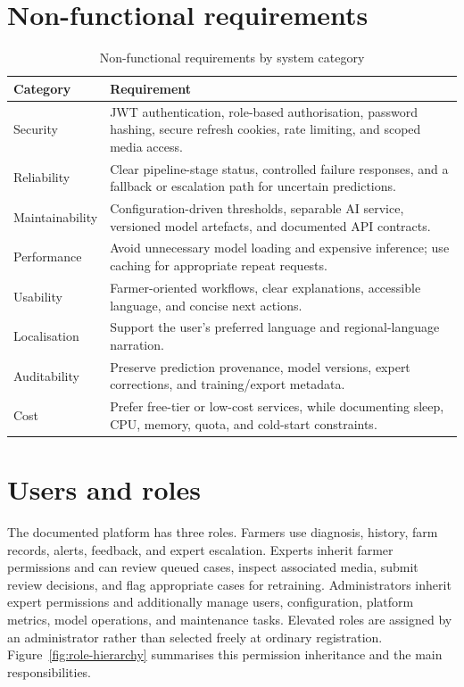 \documentclass[12pt,a4paper,oneside,openany]{report}
\begin{document}
\clearpage
\section{Non-functional requirements}
\begin{table}[H]
\centering
\small
\caption{Non-functional requirements by system category}\label{tab:non-functional-reqs}
\begin{tabular}{P{3.0cm}P{10.3cm}}
\toprule
\textbf{Category} & \textbf{Requirement}\\
\midrule
Security & JWT authentication, role-based authorisation, password hashing, secure refresh cookies, rate limiting, and scoped media access.\\
Reliability & Clear pipeline-stage status, controlled failure responses, and a fallback or escalation path for uncertain predictions.\\
Maintainability & Configuration-driven thresholds, separable AI service, versioned model artefacts, and documented API contracts.\\
Performance & Avoid unnecessary model loading and expensive inference; use caching for appropriate repeat requests.\\
Usability & Farmer-oriented workflows, clear explanations, accessible language, and concise next actions.\\
Localisation & Support the user's preferred language and regional-language narration.\\
Auditability & Preserve prediction provenance, model versions, expert corrections, and training/export metadata.\\
Cost & Prefer free-tier or low-cost services, while documenting sleep, CPU, memory, quota, and cold-start constraints.\\
\bottomrule
\end{tabular}
\end{table}

\section{Users and roles}
The documented platform has three roles. Farmers use diagnosis, history, farm records, alerts, feedback, and expert escalation. Experts inherit farmer permissions and can review queued cases, inspect associated media, submit review decisions, and flag appropriate cases for retraining. Administrators inherit expert permissions and additionally manage users, configuration, platform metrics, model operations, and maintenance tasks. Elevated roles are assigned by an administrator rather than selected freely at ordinary registration. Figure~\ref{fig:role-hierarchy} summarises this permission inheritance and the main responsibilities.
\end{document}
